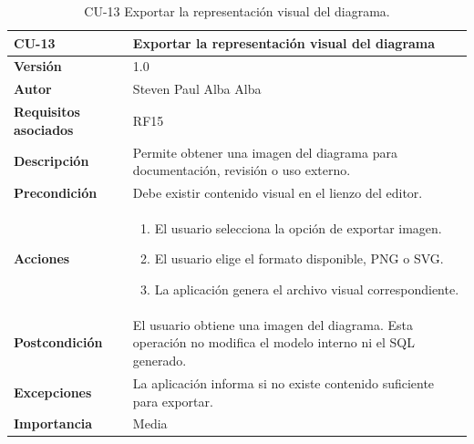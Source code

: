 \begin{table}[p]
\centering
\begin{tabularx}{\linewidth}{ p{} p{} }
\toprule
\textbf{CU-13} & \textbf{Exportar la representación visual del diagrama}\\
\toprule
\textbf{Versión} & 1.0 \\
\textbf{Autor} & Steven Paul Alba Alba \\
\textbf{Requisitos asociados} & RF15 \\
\textbf{Descripción} & Permite obtener una imagen del diagrama para documentación, revisión o uso externo. \\
\textbf{Precondición} & Debe existir contenido visual en el lienzo del editor. \\
\textbf{Acciones} &
\begin{enumerate}
\def\labelenumi{\arabic{enumi}.}
\tightlist
\item El usuario selecciona la opción de exportar imagen.
\item El usuario elige el formato disponible, PNG o SVG.
\item La aplicación genera el archivo visual correspondiente.
\end{enumerate}\\
\textbf{Postcondición} & El usuario obtiene una imagen del diagrama. Esta operación no modifica el modelo interno ni el SQL generado. \\
\textbf{Excepciones} & La aplicación informa si no existe contenido suficiente para exportar. \\
\textbf{Importancia} & Media \\
\bottomrule
\end{tabularx}
\caption{CU-13 Exportar la representación visual del diagrama.}
\end{table}

